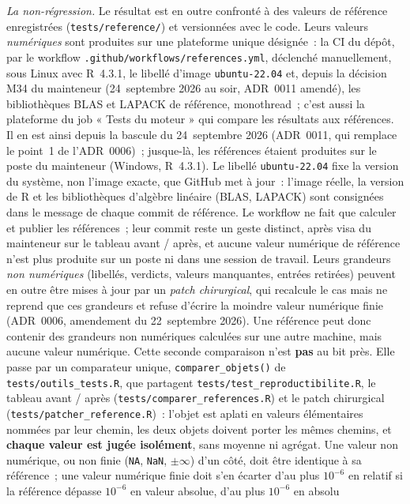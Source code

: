 \documentclass[a4paper,11pt]{article}
\newcommand{\code}[1]{\texttt{\small #1}}
\begin{document}
\emph{La non-régression.} Le résultat est en outre confronté à des valeurs de
référence enregistrées (\code{tests/reference/}) et versionnées avec le code.
Leurs valeurs \emph{numériques} sont produites sur une plateforme unique
désignée~: la CI du dépôt, par le workflow \code{.github/workflows/references.yml}, déclenché
manuellement, sous Linux avec R~4.3.1, le libellé d'image \code{ubuntu-22.04} et, depuis la
décision M34 du mainteneur (24~septembre 2026 au soir, ADR~0011 amendé), les bibliothèques
BLAS et LAPACK de référence, monothread~; c'est aussi la plateforme du job
« Tests du moteur » qui compare les résultats aux références. Il en est ainsi depuis la
bascule du 24~septembre 2026 (ADR~0011, qui remplace le point~1 de l'ADR~0006)~; jusque-là,
les références étaient produites sur le poste du mainteneur (Windows, R~4.3.1). Le libellé
\code{ubuntu-22.04} fixe la version du système, non l'image exacte, que GitHub met à jour~:
l'image réelle, la version de R et les bibliothèques d'algèbre linéaire (BLAS, LAPACK) sont
consignées dans le message de chaque commit de référence. Le workflow ne fait que calculer et
publier les références~; leur commit reste un geste distinct, après visa du mainteneur sur le
tableau avant / après, et aucune valeur numérique de référence n'est plus produite sur un
poste ni dans une session de travail. Leurs grandeurs \emph{non
numériques} (libellés, verdicts, valeurs manquantes, entrées retirées) peuvent
en outre être mises à jour par un \emph{patch chirurgical}, qui recalcule le cas
mais ne reprend que ces grandeurs et refuse d'écrire la moindre valeur
numérique finie (ADR~0006, amendement du 22~septembre 2026). Une référence
peut donc contenir des grandeurs non numériques calculées sur une autre
machine, mais aucune valeur numérique. Cette seconde comparaison n'est
\textbf{pas} au bit près. Elle passe par un comparateur unique,
\code{comparer\_objets()} de \code{tests/outils\_tests.R}, que partagent
\code{tests/test\_reproductibilite.R}, le tableau avant / après
(\code{tests/comparer\_references.R}) et le patch chirurgical
(\code{tests/patcher\_reference.R})~: l'objet est aplati en valeurs
élémentaires nommées par leur chemin, les deux objets doivent porter les mêmes
chemins, et \textbf{chaque valeur est jugée isolément}, sans moyenne ni
agrégat. Une valeur non numérique, ou non finie (\code{NA}, \code{NaN},
$\pm\infty$) d'un côté, doit être identique à sa référence~; une valeur
numérique finie doit s'en écarter d'au plus $10^{-6}$ en relatif si la
référence dépasse $10^{-6}$ en valeur absolue, d'au plus $10^{-6}$ en absolu
\end{document}

